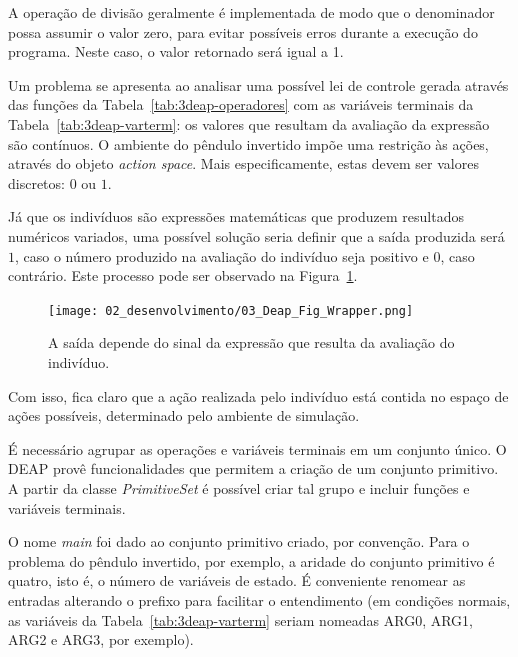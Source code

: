 A operação de divisão geralmente é implementada de modo que o denominador possa assumir o valor zero, para evitar possíveis erros durante a execução do programa. Neste caso, o valor retornado será igual a 1.

Um problema se apresenta ao analisar uma possível lei de controle gerada através das funções da Tabela~\ref{tab:3deap-operadores} com as variáveis terminais da Tabela~\ref{tab:3deap-varterm}: os valores que resultam da avaliação da expressão são contínuos. O ambiente do pêndulo invertido impõe uma restrição às ações, através do objeto \textit{action space}. Mais especificamente, estas devem ser valores discretos: $0$ ou $1$.

Já que os indivíduos são expressões matemáticas que produzem resultados numéricos variados, uma possível solução seria definir que a saída produzida será $1$, caso o número produzido na avaliação do indivíduo seja positivo e $0$, caso contrário. Este processo pode ser observado na Figura~\ref{fig:03deap-wrapper}.

\begin{figure}[H]
	\centering
	\texttt{[image: 02\_desenvolvimento/03\_Deap\_Fig\_Wrapper.png]}
	\caption{A saída depende do sinal da expressão que resulta da avaliação do indivíduo.}\label{fig:03deap-wrapper}
\end{figure}

Com isso, fica claro que a ação realizada pelo indivíduo está contida
no espaço de ações possíveis, determinado pelo ambiente de simulação.

É necessário agrupar as operações e variáveis
terminais em um conjunto único. O DEAP provê
funcionalidades que permitem a criação de um conjunto primitivo. A
partir da classe \textit{PrimitiveSet} é possível criar tal grupo e incluir funções e variáveis terminais.


O nome \textit{main} foi dado ao conjunto primitivo criado, por convenção. Para o problema do pêndulo invertido, por exemplo, a aridade do conjunto primitivo é quatro, isto é, o número de variáveis de estado. É conveniente renomear as entradas alterando o prefixo para facilitar o entendimento (em condições normais, as variáveis da Tabela~\ref{tab:3deap-varterm} seriam nomeadas ARG0, ARG1, ARG2 e ARG3, por exemplo).

